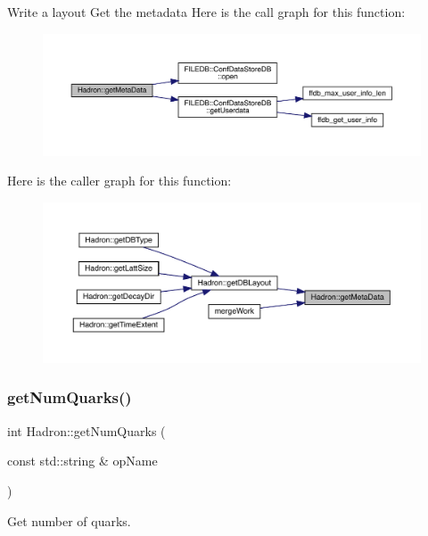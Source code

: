Write a layout Get the metadata Here is the call graph for this function\+:
\nopagebreak
\begin{figure}[H]
\begin{center}
\leavevmode
\includegraphics[width=350pt]{d1/daf/namespaceHadron_a6c9f3d44d269357faf4d786cc73ec742_cgraph}
\end{center}
\end{figure}
Here is the caller graph for this function\+:
\nopagebreak
\begin{figure}[H]
\begin{center}
\leavevmode
\includegraphics[width=350pt]{d1/daf/namespaceHadron_a6c9f3d44d269357faf4d786cc73ec742_icgraph}
\end{center}
\end{figure}
\mbox{\label{namespaceHadron_a030f1f2fabdb2b0de5421b2a0a15689c}} 
\subsubsection{\texorpdfstring{getNumQuarks()}{getNumQuarks()}}
{\footnotesize\ttfamily int Hadron\+::get\+Num\+Quarks (\begin{DoxyParamCaption}\item[{const std\+::string \&}]{op\+Name }\end{DoxyParamCaption})}



Get number of quarks. 

